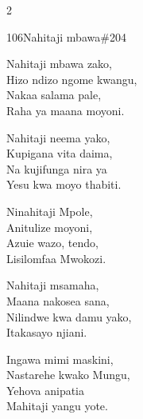 \documentclass{article}
\begin{document}
\begin{multicols}{2}
\begin{hymn}{106}{Nahitaji mbawa}{\#204}
\begin{stanza}
Nahitaji mbawa zako,\\
Hizo ndizo ngome kwangu,\\
Nakaa salama pale,\\
Raha ya maana moyoni.
\end{stanza}
\begin{stanza}
Nahitaji neema yako,\\
Kupigana vita daima,\\
Na kujifunga nira ya\\
Yesu kwa moyo thabiti.
\end{stanza}
\begin{stanza}
Ninahitaji Mpole,\\
Anitulize moyoni,\\
Azuie wazo, tendo,\\
Lisilomfaa Mwokozi.
\end{stanza}
\begin{stanza}
Nahitaji msamaha,\\
Maana nakosea sana,\\
Nilindwe kwa damu yako,\\
Itakasayo njiani.
\end{stanza}
\begin{stanza}
Ingawa mimi maskini,\\
Nastarehe kwako Mungu,\\
Yehova anipatia\\
Mahitaji yangu yote.
\end{stanza}
\end{hymn}


\end{multicols}
\end{document}
